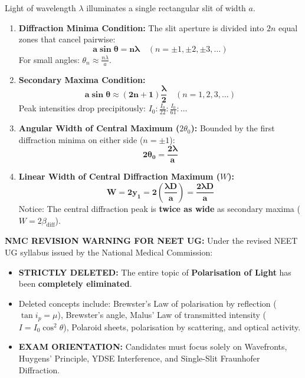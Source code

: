 \documentclass[10pt,a4paper]{article}
\begin{document}
\begin{formulabox}
Light of wavelength $\lambda$ illuminates a single rectangular slit of width $a$.
\begin{enumerate}
  \item \textbf{Diffraction Minima Condition:}
  The slit aperture is divided into $2n$ equal zones that cancel pairwise:
  \begin{equation}
    \mathbf{a \sin\theta = n \lambda} \quad (n = \pm 1, \pm 2, \pm 3, \dots)
  \end{equation}
  For small angles: $\theta_n \approx \frac{n\lambda}{a}$.
  \item \textbf{Secondary Maxima Condition:}
  \begin{equation}
    \mathbf{a \sin\theta \approx (2n+1)\frac{\lambda}{2}} \quad (n = 1, 2, 3, \dots)
  \end{equation}
  Peak intensities drop precipitously: $I_0 : \frac{I_0}{22} : \frac{I_0}{61} : \dots$
  \item \textbf{Angular Width of Central Maximum ($2\theta_0$):}
  Bounded by the first diffraction minima on either side ($n = \pm 1$):
  \begin{equation}
    \mathbf{2\theta_0 = \frac{2\lambda}{a}}
  \end{equation}
  \item \textbf{Linear Width of Central Diffraction Maximum ($W$):}
  \begin{equation}
    \mathbf{W = 2 y_1 = 2 \left(\frac{\lambda D}{a}\right) = \frac{2\lambda D}{a}}
  \end{equation}
  Notice: The central diffraction peak is \textbf{twice as wide} as secondary maxima ($W = 2\beta_{\text{diff}}$).
\end{enumerate}
\end{formulabox}

\begin{trapbox}
\textbf{NMC REVISION WARNING FOR NEET UG:}
Under the revised NEET UG syllabus issued by the National Medical Commission:
\begin{itemize}
  \item \textbf{STRICTLY DELETED:} The entire topic of \textbf{Polarisation of Light} has been \textbf{completely eliminated}.
  \item Deleted concepts include: Brewster's Law of polarisation by reflection ($\tan i_p = \mu$), Brewster's angle, Malus' Law of transmitted intensity ($I = I_0 \cos^2\theta$), Polaroid sheets, polarisation by scattering, and optical activity.
  \item \textbf{EXAM ORIENTATION:} Candidates must focus solely on Wavefronts, Huygens' Principle, YDSE Interference, and Single-Slit Fraunhofer Diffraction.
\end{itemize}
\end{trapbox}
\end{document}
